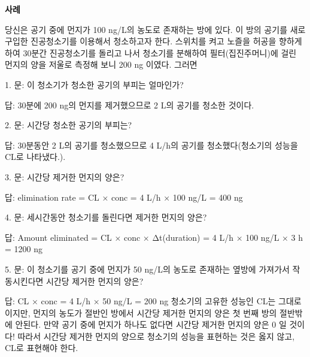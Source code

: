 \documentclass[
  11pt,
  krantz2, a4paper, twoside]{krantz}
\makeatletter
\newenvironment{kframe}{%
\medskip{}
\setlength{\fboxsep}{.8em}
 \def\at@end@of@kframe{}%
 \ifinner\ifhmode%
  \def\at@end@of@kframe{\end{minipage}}%
  \begin{minipage}{\columnwidth}%
 \fi\fi%
 \def\FrameCommand##1{\hskip\@totalleftmargin \hskip-\fboxsep
 \colorbox{shadecolor}{##1}\hskip-\fboxsep
     \hskip-\linewidth \hskip-\@totalleftmargin \hskip\columnwidth}%
 \MakeFramed {\advance\hsize-\width
   \@totalleftmargin\z@ \linewidth\hsize
   \@setminipage}}%
 {\par\unskip\endMakeFramed%
 \at@end@of@kframe}
\newenvironment{rmdblock}[1]
  {
  \begin{itemize}
  \renewcommand{\labelitemi}{
    \raisebox{-.7\height}[0pt][0pt]{
      {\setkeys{Gin}{width=3em,keepaspectratio}\texttt{[image: images/\#1]}}
    }
  }
  \setlength{\fboxsep}{1em}
  \begin{kframe}
  \item
  }
  {
  \end{kframe}
  \end{itemize}
  }
\newenvironment{rmdtip}
  {\begin{rmdblock}{tip}}
  {\end{rmdblock}}
\theoremstyle{definition}
\theoremstyle{definition}
\theoremstyle{definition}
\theoremstyle{definition}
\theoremstyle{remark}
\makeatother
\begin{document}
\textbf{사례}

당신은 공기 중에 먼지가 100 ng/L의 농도로 존재하는 방에 있다. 이 방의 공기를 새로 구입한 진공청소기를 이용해서 청소하고자 한다.
스위치를 켜고 노즐을 허공을 향하게 하여 30분간 진공청소기를 돌리고 나서 청소기를 분해하여 필터(집진주머니)에 걸린 먼지의 양을 저울로 측정해 보니 200 ng 이였다.
그러면

\begin{rmdtip}
1. 문: 이 청소기가 청소한 공기의 부피는 얼마인가?

답: 30분에 200 ng의 먼지를 제거했으므로 2 L의 공기를 청소한 것이다.
\end{rmdtip}

\begin{rmdtip}
2. 문: 시간당 청소한 공기의 부피는?

답: 30분동안 2 L의 공기를 청소했으므로 4 L/h의 공기를 청소했다(청소기의 성능을 CL로 나타냈다.).
\end{rmdtip}

\begin{rmdtip}
3. 문: 시간당 제거한 먼지의 양은?

답: elimination rate = CL × conc = 4 L/h × 100 ng/L = 400 ng
\end{rmdtip}

\begin{rmdtip}
4. 문: 세시간동안 청소기를 돌린다면 제거한 먼지의 양은?

답: Amount eliminated = CL × conc × Δt(duration) = 4 L/h × 100 ng/L × 3 h = 1200 ng
\end{rmdtip}

\begin{rmdtip}
5. 문: 이 청소기를 공기 중에 먼지가 50 ng/L의 농도로 존재하는 옆방에 가져가서 작동시킨다면 시간당 제거한 먼지의 양은?

답: CL × conc = 4 L/h × 50 ng/L = 200 ng 청소기의 고유한 성능인 CL는
그대로이지만, 먼지의 농도가 절반인 방에서 시간당 제거한 먼지의 양은
첫 번째 방의 절반밖에 안된다. 만약 공기 중에 먼지가 하나도 없다면
시간당 제거한 먼지의 양은 0 일 것이다! 따라서 시간당 제거한 먼지의
양으로 청소기의 성능을 표현하는 것은 옳지 않고, CL로 표현해야 한다.
\end{rmdtip}
\end{document}
